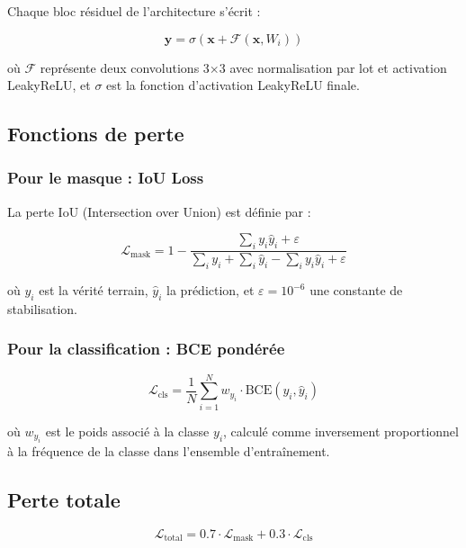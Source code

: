 \documentclass[12pt,a4paper,twoside]{report}
\begin{document}
Chaque bloc résiduel de l'architecture s'écrit :

\begin{equation}
\mathbf{y} = \sigma(\mathbf{x} + \mathcal{F}(\mathbf{x}, W_i))
\end{equation}

où $\mathcal{F}$ représente deux convolutions 3$\times$3 avec normalisation par lot et activation LeakyReLU, et $\sigma$ est la fonction d'activation LeakyReLU finale.

\subsection{Fonctions de perte}

\subsubsection{Pour le masque : IoU Loss}

La perte IoU (Intersection over Union) est définie par :

\begin{equation}
\mathcal{L}_{\text{mask}} = 1 - \frac{\sum_{i} y_i \hat{y}_i + \varepsilon}{\sum_{i} y_i + \sum_{i} \hat{y}_i - \sum_{i} y_i \hat{y}_i + \varepsilon}
\end{equation}

où $y_i$ est la vérité terrain, $\hat{y}_i$ la prédiction, et $\varepsilon = 10^{-6}$ une constante de stabilisation.

\subsubsection{Pour la classification : BCE pondérée}

\begin{equation}
\mathcal{L}_{\text{cls}} = \frac{1}{N} \sum_{i=1}^{N} w_{y_i} \cdot \text{BCE}(y_i, \hat{y}_i)
\end{equation}

où $w_{y_i}$ est le poids associé à la classe $y_i$, calculé comme inversement proportionnel à la fréquence de la classe dans l'ensemble d'entraînement.

\subsection{Perte totale}

\begin{equation}
\mathcal{L}_{\text{total}} = 0.7 \cdot \mathcal{L}_{\text{mask}} + 0.3 \cdot \mathcal{L}_{\text{cls}}
\end{equation}
\end{document}
